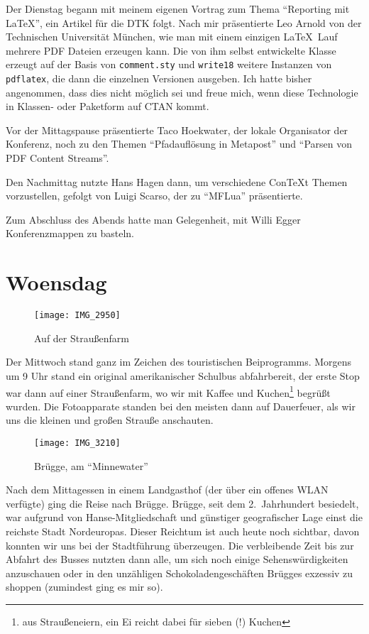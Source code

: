 \documentclass[12pt,ngerman]{dtk}
\begin{document}
Der Dienstag begann mit meinem eigenen Vortrag zum Thema \enquote{Reporting mit \LaTeX}, ein
 Artikel für die DTK folgt. Nach mir präsentierte Leo Arnold von der Technischen Universität München, 
wie man mit einem einzigen \LaTeX\ Lauf mehrere PDF Dateien erzeugen kann. Die von ihm selbst
 entwickelte Klasse erzeugt auf der Basis von \texttt{comment.sty} und \texttt{write18} weitere
 Instanzen von \texttt{pdflatex}, die dann die einzelnen Versionen ausgeben. Ich hatte bisher
 angenommen, dass dies nicht möglich sei und freue mich, wenn diese Technologie in Klassen- oder
 Paketform auf CTAN kommt.

Vor der Mittagspause präsentierte Taco Hoekwater, der lokale Organisator der Konferenz, noch zu den
 Themen \enquote{Pfadauflösung in Metapost} und \enquote{Parsen von PDF Content Streams}.

Den Nachmittag nutzte Hans Hagen dann, um verschiedene Con\TeX t Themen vorzustellen, gefolgt von
 Luigi Scarso, der zu \enquote{MFLua} präsentierte.

Zum Abschluss des Abends hatte man Gelegenheit, mit Willi Egger Konferenzmappen zu basteln.

\section{Woensdag}

\begin{figure}
\centering
\texttt{[image: IMG\_2950]}
\caption{Auf der Straußenfarm}
\end{figure}


Der Mittwoch stand ganz im Zeichen des touristischen Beiprogramms. Morgens um 9 Uhr stand ein
 original amerikanischer Schulbus abfahrbereit, der erste Stop war dann auf einer Straußenfarm, wo wir
 mit Kaffee und Kuchen\footnote{aus Straußeneiern, ein Ei reicht dabei für sieben (!) Kuchen} begrüßt
 wurden. Die Fotoapparate standen bei den meisten dann auf Dauerfeuer, als wir uns die kleinen und großen Strauße anschauten.

\begin{figure}
\centering
\texttt{[image: IMG\_3210]}
\caption{Brügge, am \enquote{Minnewater}}
\end{figure}


Nach dem Mittagessen in einem Landgasthof (der über ein offenes WLAN verfügte) ging die Reise nach Brügge. Brügge, seit dem 2.~Jahrhundert besiedelt, war aufgrund von Hanse-Mitgliedschaft und günstiger geografischer Lage einst die reichste Stadt  Nordeuropas. Dieser Reichtum ist auch heute noch sichtbar, davon konnten wir uns bei der Stadtführung überzeugen. Die verbleibende Zeit bis zur Abfahrt des Busses nutzten dann alle, um sich noch einige Sehenswürdigkeiten anzuschauen oder in den unzähligen Schokoladengeschäften Brügges exzessiv zu shoppen (zumindest ging es mir so).
\end{document}
